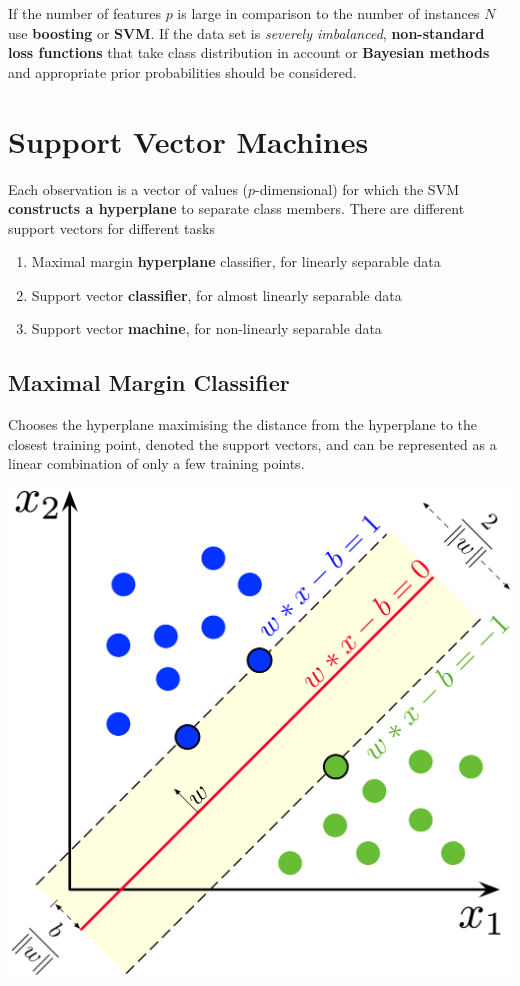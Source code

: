 \documentclass[11pt]{article}
\theoremstyle{definition}
\begin{document}
If the number of features $p$ is large in comparison to the number of instances $N$ use \textbf{boosting} or \textbf{SVM}. If the data set is \emph{severely imbalanced}, \textbf{non-standard loss functions} that take class distribution in account or \textbf{Bayesian methods} and appropriate prior probabilities should be considered.

\section{Support Vector Machines}

Each observation is a vector of values ($p$-dimensional) for which the SVM \textbf{constructs a hyperplane} to separate class members. There are different support vectors for different tasks
\begin{enumerate}
	\item Maximal margin \textbf{hyperplane} classifier, for linearly separable data
	\item Support vector \textbf{classifier}, for almost linearly separable data
	\item Support vector \textbf{machine}, for non-linearly separable data
\end{enumerate}

\subsection{Maximal Margin Classifier}
\begin{minipage}{0.6\linewidth}
	Chooses the hyperplane maximising the distance from the hyperplane to the closest training point, denoted the support vectors, and can be represented as a linear combination of only a few training points.
\end{minipage}
\begin{minipage}{0.4\linewidth}
	\centering
	\includegraphics[keepaspectratio,width=0.8\linewidth]{img/maximum_margin_classifier.png}
\end{minipage}
\end{document}
